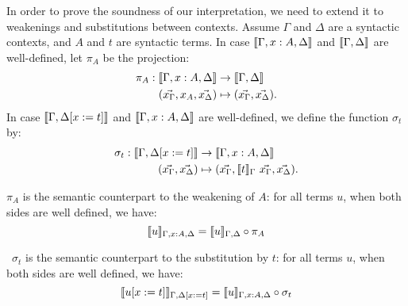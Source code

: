 In order to prove the soundness of our interpretation, we need to extend it to weakenings
and substitutions between contexts.
%
Assume \( \Gamma \) and \( \Delta \) are a syntactic contexts, and \( A \) and \( t \)
are syntactic terms.
%
In case \( \mctx{\Gamma, \tm{x}{A}, \Delta} \) and \( \mctx{\Gamma, \Delta} \) are well-defined,
let \( \pi_A \) be the projection:
{\small
\[
  \begin{split}
  \pi_A : \mctx{\Gamma, \tm{x}{A}, \Delta} & \to \mctx{\Gamma, \Delta} \\
  (\vec{x_\Gamma}, x_A, \vec{x_\Delta}) & \mapsto (\vec{x_\Gamma}, \vec{x_\Delta}).
  \end{split}
\]
}
In case \( \mctx{\Gamma, \subst{\Delta}{t}} \) and \( \mctx{\Gamma, \tm{x}{A}, \Delta} \) are
well-defined, we define the function \( \sigma_t \) by:
{\small
\[
  \begin{split}
    \sigma_t : \mctx{\Gamma, \subst{\Delta}{t}} & \to \mctx{\Gamma, \tm{x}{A}, \Delta} \\
    (\vec{x_\Gamma}, \vec{x_\Delta}) & \mapsto (\vec{x_\Gamma}, \mty{t}\ \vec{x_\Gamma}, \vec{x_\Delta}).
  \end{split}
\]
}
%
\begin{lemma}[Weakening]\label{lem:weakening}
  \( \pi_A \) is the semantic counterpart to the weakening of \( A \): for all terms \( u \),
  when both sides are well defined, we have:
  {\small
\[
    \mty[{\Gamma, \tm{x}{A}, \Delta}]{u} = \mty[{\Gamma, \Delta}]{u} \circ \pi_A
  \]}
\end{lemma}
%
\begin{lemma}[Substitution]\label{lem:substitution}\ \( \sigma_t \) is the semantic counterpart to the substitution by \( t \):
  for all terms \( u \), when both sides are well defined, we have:
  {\small
\[
    \mty[{\Gamma, \subst{\Delta}{t}}]{\subst{u}{t}} = \mty[{\Gamma, \tm{x}{A}, \Delta}]{u} \circ \sigma_t
  \]}
\end{lemma}

